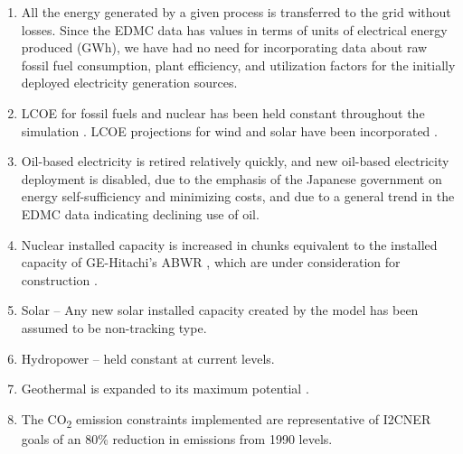 \documentclass[14pt,a4paper]{article} %
\begin{document}
\begin{enumerate}

\item All the energy generated by a given process is transferred to the grid without losses. Since the \gls{EDMC} data has values in terms of units of electrical energy produced (GWh), we have had no need for incorporating data about raw fossil fuel consumption, plant efficiency, and utilization factors for the initially deployed electricity generation sources.

\item \gls{LCOE} for fossil fuels and nuclear has been held constant throughout the simulation \cite{chapman_energy_2018,noauthor_lazards_2017,noauthor_iea_2017}. \gls{LCOE} projections for wind and solar have been incorporated \cite{noauthor_lazards_2017}.

\item Oil-based electricity is retired relatively quickly, and new oil-based electricity deployment is disabled, due to the emphasis of the Japanese government on energy self-sufficiency and minimizing costs, and due to a general trend in the \gls{EDMC} data \cite{noauthor_energy_2018} indicating declining use of oil.

\item Nuclear installed  capacity is increased in chunks equivalent to the installed  capacity of GE-Hitachi's \gls{ABWR} \cite{ge_advanced_2007}, which are under consideration for construction \cite{noauthor_electricity_2017}.

\item Solar – Any new solar installed  capacity created by the model has been assumed to be non-tracking type.

\item Hydropower – held constant at current levels.

\item Geothermal is expanded to its maximum potential \cite{noauthor_geothermal_2018}.

\item The CO\textsubscript{2} emission constraints implemented are representative of \gls{I2CNER} goals of an 80\% reduction in emissions from 1990 levels.
\end{enumerate}
\end{document}
